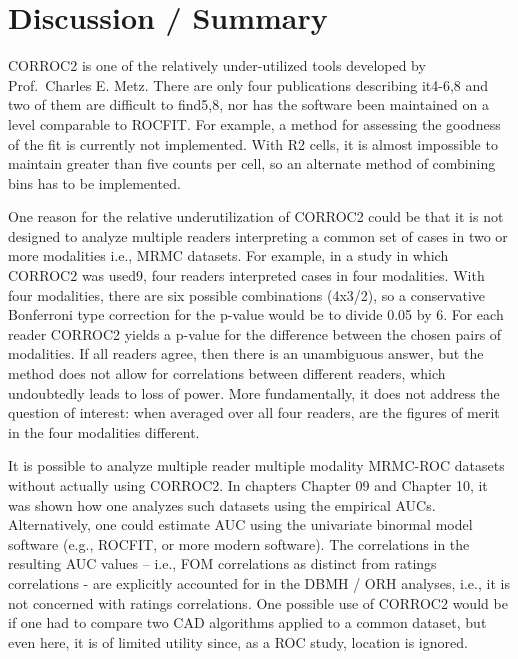 \documentclass[
]{book}
\begin{document}
\hypertarget{bivariate-binormal-model-corroc2-discussion}{%
\section{Discussion / Summary}\label{bivariate-binormal-model-corroc2-discussion}}

CORROC2 is one of the relatively under-utilized tools developed by Prof.~Charles E. Metz. There are only four publications describing it4-6,8 and two of them are difficult to find5,8, nor has the software been maintained on a level comparable to ROCFIT. For example, a method for assessing the goodness of the fit is currently not implemented. With R2 cells, it is almost impossible to maintain greater than five counts per cell, so an alternate method of combining bins has to be implemented.

One reason for the relative underutilization of CORROC2 could be that it is not designed to analyze multiple readers interpreting a common set of cases in two or more modalities i.e., MRMC datasets. For example, in a study in which CORROC2 was used9, four readers interpreted cases in four modalities. With four modalities, there are six possible combinations (4x3/2), so a conservative Bonferroni type correction for the p-value would be to divide 0.05 by 6. For each reader CORROC2 yields a p-value for the difference between the chosen pairs of modalities. If all readers agree, then there is an unambiguous answer, but the method does not allow for correlations between different readers, which undoubtedly leads to loss of power. More fundamentally, it does not address the question of interest: when averaged over all four readers, are the figures of merit in the four modalities different.

It is possible to analyze multiple reader multiple modality MRMC-ROC datasets without actually using CORROC2. In chapters Chapter 09 and Chapter 10, it was shown how one analyzes such datasets using the empirical AUCs. Alternatively, one could estimate AUC using the univariate binormal model software (e.g., ROCFIT, or more modern software). The correlations in the resulting AUC values -- i.e., FOM correlations as distinct from ratings correlations - are explicitly accounted for in the DBMH / ORH analyses, i.e., it is not concerned with ratings correlations. One possible use of CORROC2 would be if one had to compare two CAD algorithms applied to a common dataset, but even here, it is of limited utility since, as a ROC study, location is ignored.
\end{document}
